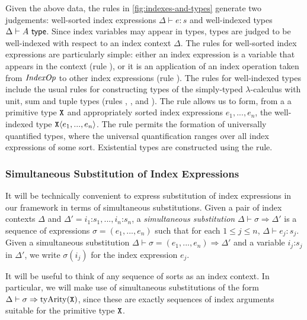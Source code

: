 Given the above data, the rules in \autoref{fig:indexes-and-types}
generate two judgements: well-sorted index expressions $\Delta \vdash
e : s$ and well-indexed types $\Delta \vdash A \textsf{ type}$. Since index
variables may appear in types, types are judged to be well-indexed
with respect to an index context $\Delta$. The rules for well-sorted
index expressions are particularly simple: either an index expression
is a variable that appears in the context (rule ), or it
is an application of an index operation taken from $\mathit{IndexOp}$ to
other index expressions (rule ). The rules for
well-indexed types include the usual rules for constructing types of
the simply-typed $\lambda$-calculus with unit, sum and tuple types
(rules , ,  and
). The rule  allows us to form, from a
a primitive type $\texttt{X}$ and appropriately sorted index
expressions $e_1,...,e_n$, the well-indexed type
$\texttt{X}\langle e_1,...,e_n \rangle$. The rule  permits the
formation of universally quantified types, where the universal
quantification ranges over all index expressions of some
sort. Existential types are constructed using the 
rule.

\subsubsection{Simultaneous Substitution of Index Expressions}
\label{sec:simultaneous-substitution}

It will be technically convenient to express substitution of index
expressions in our framework in terms of simultaneous substitutions.
Given a pair of index contexts $\Delta$ and $\Delta' = i_1 \mathord:
s_1, ..., i_n \mathord: s_n$, a \emph{simultaneous substitution}
$\Delta \vdash \sigma \Rightarrow \Delta'$ is a sequence of
expressions $\sigma = (e_1,...,e_n)$ such that for each $1 \leq j \leq
n$, $\Delta \vdash e_j : s_j$. Given a simultaneous substitution
$\Delta \vdash \sigma = (e_1,...,e_n) \Rightarrow \Delta'$ and a
variable $i_j \mathord: s_j$ in $\Delta'$, we write $\sigma(i_j)$ for
the index expression $e_j$.

It will be useful to think of any sequence of sorts as an index
context. In particular, we will make use of simultaneous substitutions
of the form $\Delta \vdash \sigma \Rightarrow
\mathrm{tyArity}(\texttt{X})$, since these are exactly sequences of
index arguments suitable for the primitive type $\texttt{X}$.

